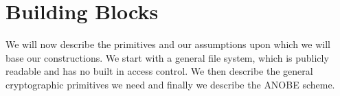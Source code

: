 \section{Building Blocks}
\label{BuildingBlocks}

We will now describe the primitives and our assumptions upon which we will base
our constructions.
We start with a general file system, which is publicly readable and has no 
built in access control.
We then describe the general cryptographic primitives we need and finally we 
describe the \ac{ANOBE} scheme.




